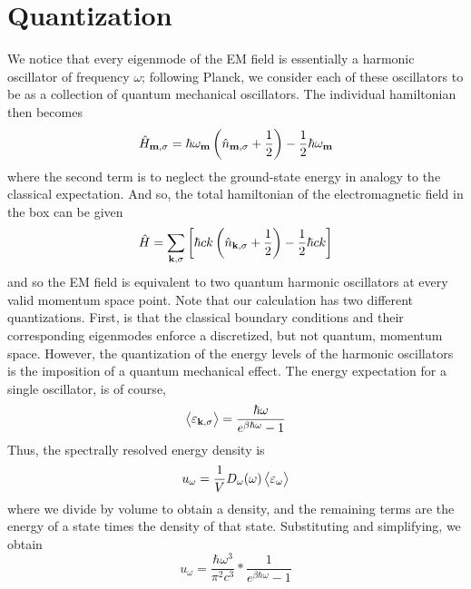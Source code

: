 \section{Quantization}
We notice that every eigenmode of the EM field is essentially a harmonic oscillator of frequency \(\omega\); following Planck, we consider each of these oscillators to be as a collection of quantum mechanical oscillators. The individual hamiltonian then becomes
\[\hat H_{\mathbf{m}, \sigma} = \hbar\omega_{\mathbf{m}}\left(\hat n_{\mathbf{m}, \sigma}+\frac{1}{2}\right)-\frac{1}{2}\hbar\omega_{\mathbf{m}}\]
where the second term is to neglect the ground-state energy in analogy to the classical expectation. And so, the total hamiltonian of the electromagnetic field in the box can be given
\begin{equation}
	\hat H = \sum_{\mathbf{k}, \sigma} \left[\hbar c k \left(\hat n_{\mathbf{k}, \sigma}+\frac{1}{2}\right)-\frac{1}{2}\hbar ck\right]
\end{equation}
and so the EM field is equivalent to two quantum harmonic oscillators at every valid momentum space point. Note that our calculation has two different quantizations. First, is that the classical boundary conditions and their corresponding eigenmodes enforce a discretized, but not quantum, momentum space. However, the quantization of the energy levels of the harmonic oscillators is the imposition of a quantum mechanical effect. The energy expectation for a single oscillator, is of course,
\[\left\langle \begin{matrix}\varepsilon_{\mathbf{k}, \sigma}\end{matrix} \right\rangle = \frac{\hbar\omega}{e^{\beta\hbar\omega}-1}\]
Thus, the spectrally resolved energy density is
\[u_\omega = \frac{1}{V}D_\omega(\omega)\left\langle \begin{matrix}\varepsilon_{\omega}\end{matrix} \right\rangle\]
where we divide by volume to obtain a density, and the remaining terms are the energy of a state times the density of that state. 
Substituting and simplifying, we obtain
\begin{equation}
u_\omega = \frac{\hbar\omega^3}{\pi^2 c^3}*\frac{1}{e^{\beta\hbar\omega}-1}
\end{equation}

